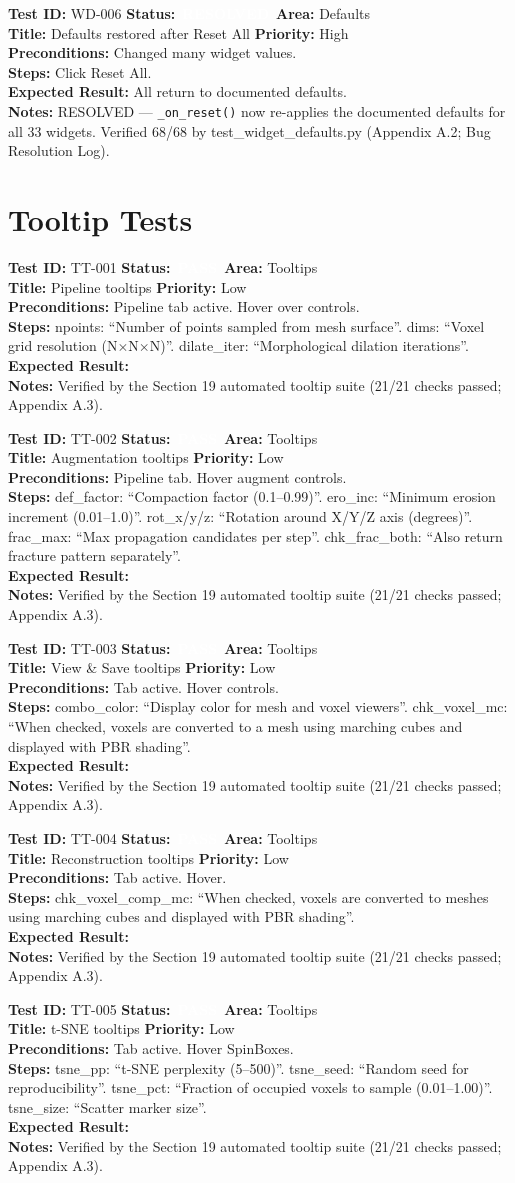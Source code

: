 \documentclass[12pt,a4paper]{article}
\newcommand{\statuspass}{\colorbox{statusgreen}{\textcolor{white}{\textbf{\,PASS\,}}}}
\newcommand{\statusresolved}{\colorbox{statusorange}{\textcolor{white}{\textbf{\,RESOLVED\,}}}}
\newcommand{\testcase}[9]{%
  \smallskip
  \noindent\textbf{Test ID:} #1 \hfill \textbf{Status:} #2 \hfill \textbf{Area:} #3 \\
  \textbf{Title:} #4 \hfill \textbf{Priority:} #5 \\[0.3em]
  \textbf{Preconditions:} #6 \\[0.3em]
  \textbf{Steps:} #7 \\[0.3em]
  \textbf{Expected Result:} #8 \\
  \textbf{Notes:} #9
  \smallskip
}
\begin{document}
\testcase{WD-006}{\statusresolved}{Defaults}{Defaults restored after Reset All}{High}{Changed many widget values.}{Click Reset All.}{All return to documented defaults.}{RESOLVED --- \texttt{\_on\_reset()} now re-applies the documented defaults for all 33 widgets. Verified 68/68 by test\_widget\_defaults.py (Appendix A.2; Bug Resolution Log).}



\section{Tooltip Tests}

\testcase{TT-001}{\statuspass}{Tooltips}{Pipeline tooltips}{Low}{Pipeline tab active. Hover over controls.}{npoints: ``Number of points sampled from mesh surface''. dims: ``Voxel grid resolution (N$\times$N$\times$N)''. dilate\_iter: ``Morphological dilation iterations''.}{}{Verified by the Section 19 automated tooltip suite (21/21 checks passed; Appendix A.3).}


\testcase{TT-002}{\statuspass}{Tooltips}{Augmentation tooltips}{Low}{Pipeline tab. Hover augment controls.}{def\_factor: ``Compaction factor (0.1--0.99)''. ero\_inc: ``Minimum erosion increment (0.01--1.0)''. rot\_x/y/z: ``Rotation around X/Y/Z axis (degrees)''. frac\_max: ``Max propagation candidates per step''. chk\_frac\_both: ``Also return fracture pattern separately''.}{}{Verified by the Section 19 automated tooltip suite (21/21 checks passed; Appendix A.3).}


\testcase{TT-003}{\statuspass}{Tooltips}{View \& Save tooltips}{Low}{Tab active. Hover controls.}{combo\_color: ``Display color for mesh and voxel viewers''. chk\_voxel\_mc: ``When checked, voxels are converted to a mesh using marching cubes and displayed with PBR shading''.}{}{Verified by the Section 19 automated tooltip suite (21/21 checks passed; Appendix A.3).}


\testcase{TT-004}{\statuspass}{Tooltips}{Reconstruction tooltips}{Low}{Tab active. Hover.}{chk\_voxel\_comp\_mc: ``When checked, voxels are converted to meshes using marching cubes and displayed with PBR shading''.}{}{Verified by the Section 19 automated tooltip suite (21/21 checks passed; Appendix A.3).}


\testcase{TT-005}{\statuspass}{Tooltips}{t-SNE tooltips}{Low}{Tab active. Hover SpinBoxes.}{tsne\_pp: ``t-SNE perplexity (5--500)''. tsne\_seed: ``Random seed for reproducibility''. tsne\_pct: ``Fraction of occupied voxels to sample (0.01--1.00)''. tsne\_size: ``Scatter marker size''.}{}{Verified by the Section 19 automated tooltip suite (21/21 checks passed; Appendix A.3).}
\end{document}
